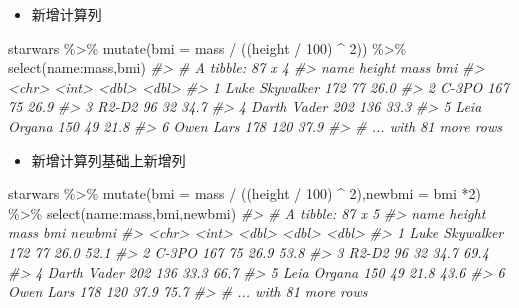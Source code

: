 \documentclass[
]{book}
\newenvironment{Shaded}{\begin{snugshade}}{\end{snugshade}}
\newcommand{\AttributeTok}[1]{\textcolor[rgb]{0.77,0.63,0.00}{#1}}
\newcommand{\CommentTok}[1]{\textcolor[rgb]{0.56,0.35,0.01}{\textit{#1}}}
\newcommand{\DecValTok}[1]{\textcolor[rgb]{0.00,0.00,0.81}{#1}}
\newcommand{\FunctionTok}[1]{\textcolor[rgb]{0.00,0.00,0.00}{#1}}
\newcommand{\NormalTok}[1]{#1}
\newcommand{\SpecialCharTok}[1]{\textcolor[rgb]{0.00,0.00,0.00}{#1}}
\providecommand{\tightlist}{%
  \setlength{\itemsep}{0pt}\setlength{\parskip}{0pt}}
\begin{document}
\begin{itemize}
\tightlist
\item
  新增计算列
\end{itemize}

\begin{Shaded}
\begin{Highlighting}[]
\NormalTok{starwars }\SpecialCharTok{\%\textgreater{}\%} 
  \FunctionTok{mutate}\NormalTok{(}\AttributeTok{bmi =}\NormalTok{ mass }\SpecialCharTok{/}\NormalTok{ ((height }\SpecialCharTok{/} \DecValTok{100}\NormalTok{)  }\SpecialCharTok{\^{}} \DecValTok{2}\NormalTok{)) }\SpecialCharTok{\%\textgreater{}\%} 
  \FunctionTok{select}\NormalTok{(name}\SpecialCharTok{:}\NormalTok{mass,bmi)}
\CommentTok{\#\textgreater{} \# A tibble: 87 x 4}
\CommentTok{\#\textgreater{}   name           height  mass   bmi}
\CommentTok{\#\textgreater{}   \textless{}chr\textgreater{}           \textless{}int\textgreater{} \textless{}dbl\textgreater{} \textless{}dbl\textgreater{}}
\CommentTok{\#\textgreater{} 1 Luke Skywalker    172    77  26.0}
\CommentTok{\#\textgreater{} 2 C{-}3PO             167    75  26.9}
\CommentTok{\#\textgreater{} 3 R2{-}D2              96    32  34.7}
\CommentTok{\#\textgreater{} 4 Darth Vader       202   136  33.3}
\CommentTok{\#\textgreater{} 5 Leia Organa       150    49  21.8}
\CommentTok{\#\textgreater{} 6 Owen Lars         178   120  37.9}
\CommentTok{\#\textgreater{} \# ... with 81 more rows}
\end{Highlighting}
\end{Shaded}

\begin{itemize}
\tightlist
\item
  新增计算列基础上新增列
\end{itemize}

\begin{Shaded}
\begin{Highlighting}[]
\NormalTok{starwars }\SpecialCharTok{\%\textgreater{}\%} 
  \FunctionTok{mutate}\NormalTok{(}\AttributeTok{bmi =}\NormalTok{ mass }\SpecialCharTok{/}\NormalTok{ ((height }\SpecialCharTok{/} \DecValTok{100}\NormalTok{)  }\SpecialCharTok{\^{}} \DecValTok{2}\NormalTok{),}\AttributeTok{newbmi =}\NormalTok{ bmi }\SpecialCharTok{*}\DecValTok{2}\NormalTok{) }\SpecialCharTok{\%\textgreater{}\%} 
  \FunctionTok{select}\NormalTok{(name}\SpecialCharTok{:}\NormalTok{mass,bmi,newbmi)}
\CommentTok{\#\textgreater{} \# A tibble: 87 x 5}
\CommentTok{\#\textgreater{}   name           height  mass   bmi newbmi}
\CommentTok{\#\textgreater{}   \textless{}chr\textgreater{}           \textless{}int\textgreater{} \textless{}dbl\textgreater{} \textless{}dbl\textgreater{}  \textless{}dbl\textgreater{}}
\CommentTok{\#\textgreater{} 1 Luke Skywalker    172    77  26.0   52.1}
\CommentTok{\#\textgreater{} 2 C{-}3PO             167    75  26.9   53.8}
\CommentTok{\#\textgreater{} 3 R2{-}D2              96    32  34.7   69.4}
\CommentTok{\#\textgreater{} 4 Darth Vader       202   136  33.3   66.7}
\CommentTok{\#\textgreater{} 5 Leia Organa       150    49  21.8   43.6}
\CommentTok{\#\textgreater{} 6 Owen Lars         178   120  37.9   75.7}
\CommentTok{\#\textgreater{} \# ... with 81 more rows}
\end{Highlighting}
\end{Shaded}
\end{document}
